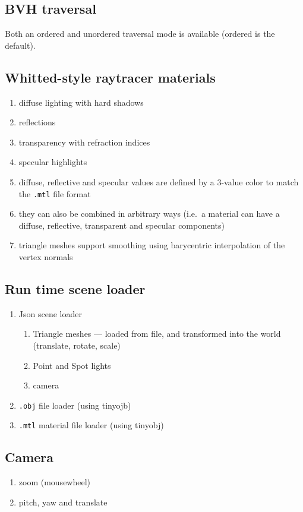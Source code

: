 \subsection{BVH traversal}
Both an ordered and unordered traversal mode is available (ordered is the default).

\subsection{Whitted-style raytracer materials}
    \begin{enumerate}
    \item diffuse lighting with hard shadows
    \item reflections
    \item transparency with refraction indices
    \item specular highlights
    \item diffuse, reflective and specular values are defined by a 3-value color to match the \verb|.mtl| file format
    \item they can also be combined in arbitrary ways (i.e.\ a material can have a diffuse, reflective, transparent and specular components)
    \item triangle meshes support smoothing using barycentric interpolation of the vertex normals
    \end{enumerate}

\subsection{Run time scene loader}
    \begin{enumerate}
    \item Json scene loader
        \begin{enumerate}
        \item Triangle meshes --- loaded from file, and transformed into the world (translate, rotate, scale)
        \item Point and Spot lights
        \item camera
        \end{enumerate}
    \item \verb|.obj| file loader (using tinyojb)
    \item \verb|.mtl| material file loader (using tinyobj)
    \end{enumerate}

\subsection{Camera}
    \begin{enumerate}
    \item zoom (mousewheel)
    \item pitch, yaw and translate
    \end{enumerate}


